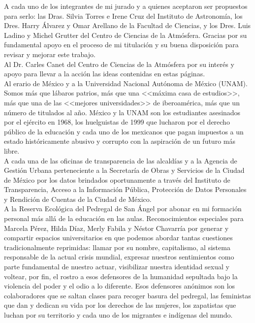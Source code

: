 A cada uno de los integrantes de mi jurado y a quienes aceptaron ser propuestos para serlo: las Dras. Silvia Torres e Irene Cruz del Instituto de Astronomía, los Dres. Harry Álvarez y Omar Arellano de la Facultad de Ciencias, y los Dres. Luis Ladino y Michel Grutter del Centro de Ciencias de la Atmósfera. Gracias por su fundamental apoyo en el proceso de mi titulación y su buena disposición para revisar y mejorar este trabajo.\\

Al Dr. Carles Canet del Centro de Ciencias de la Atmósfera por su interés y apoyo para llevar a la acción las ideas contenidas en estas páginas.\\

Al erario de México y a la Universidad Nacional Autónoma de México (UNAM). Somos más que lábaros patrios, más que una <<máxima casa de estudios>>, más que una de las <<mejores universidades>> de iberoamérica, más que un número de titulados al año. México y la UNAM son los estudiantes asesinados por el ejército en 1968, los huelguistas de 1999 que lucharon por el derecho público de la educación y cada uno de los mexicanos que pagan impuestos a un estado históricamente abusivo y corrupto con la aspiración de un futuro más libre.\\

A cada una de las oficinas de transparencia de las alcaldías y a la Agencia de Gestión Urbana perteneciente a la Secretaría de Obras y Servicios de la Ciudad de México  por los datos brindados oportunamente a través del Instituto de Transparencia, Acceso a la Información Pública, Protección de Datos Personales y Rendición de Cuentas de la Ciudad de México.\\

A la Reserva Ecológica del Pedregal de San Ángel por abonar en mi formación personal más allá de la educación en las aulas. Reconocimientos especiales para Marcela Pérez, Hilda Díaz, Merly Fabila y Néstor Chavarría por generar y compartir espacios universitarios en que podemos abordar tantas cuestiones tradicionalmente reprimidas: llamar por su nombre, capitalismo, al sistema responsable de la actual crisis mundial, expresar nuestros sentimientos como parte fundamental de nuestro actuar, visibilizar nuestra identidad sexual y voltear, por fin, el rostro a esos defensores de la humanidad sepultada bajo la violencia del poder y el odio a lo diferente. Esos defensores anónimos son los colaboradores que se saltan clases para recoger basura del pedregal, las feministas que dan y dedican su vida por los derechos de las mujeres, los zapatistas que luchan por su territorio y cada uno de los migrantes e indígenas del mundo.\\

